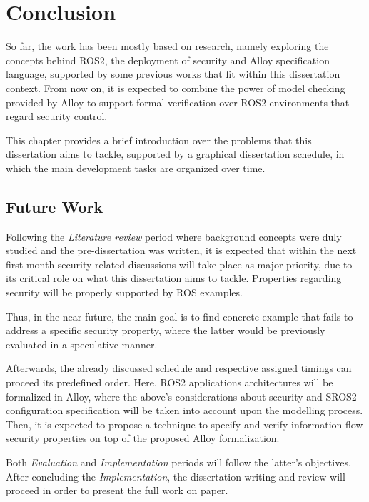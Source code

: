 \chapter{Conclusion}\label{c:conclusion}

So far, the work has been mostly based on research, namely exploring the concepts behind ROS2, the deployment of security and Alloy specification language, supported by some previous works that fit within this dissertation context. From now on, it is expected to combine the power of model checking provided by Alloy to support formal verification over ROS2 environments that regard security control. 

This chapter provides a brief introduction over the problems that this dissertation aims to tackle, supported by a graphical dissertation schedule, in which the main development tasks are organized over time.

\section{Future Work}

Following the \textit{Literature review} period where background concepts were duly studied and the pre-dissertation was written, it is expected that within the next first month security-related discussions will take place as major priority, due to its critical role on what this dissertation aims to tackle. Properties regarding security will be properly supported by ROS examples. 

Thus, in the near future, the main goal is to find concrete example that fails to address a specific security property, where the latter would be previously evaluated in a speculative manner. 

Afterwards, the already discussed schedule and respective assigned timings can proceed its predefined order. Here, ROS2 applications architectures will be formalized in Alloy, where the above's considerations about security and SROS2 configuration specification will be taken into account upon the modelling process. Then, it is expected to propose  a technique to specify and verify information-flow security properties on top of the proposed Alloy formalization.

Both \textit{Evaluation} and \textit{Implementation} periods will follow the latter's objectives. After concluding the \textit{Implementation}, the dissertation writing and review will proceed in order to present the full work on paper.

